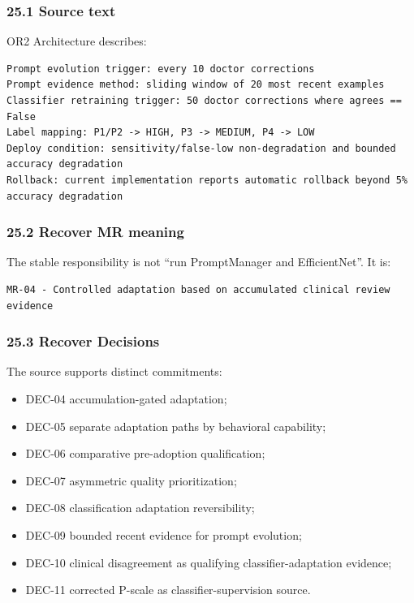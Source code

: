 \documentclass[11pt,a4paper]{article}
\providecommand{\tightlist}{\setlength{\itemsep}{0pt}\setlength{\parskip}{0pt}}
\begin{document}
\subsubsection{25.1 Source text}\label{251-source-text}

OR2 Architecture describes:

\begin{verbatim}
Prompt evolution trigger: every 10 doctor corrections
Prompt evidence method: sliding window of 20 most recent examples
Classifier retraining trigger: 50 doctor corrections where agrees == False
Label mapping: P1/P2 -> HIGH, P3 -> MEDIUM, P4 -> LOW
Deploy condition: sensitivity/false-low non-degradation and bounded accuracy degradation
Rollback: current implementation reports automatic rollback beyond 5% accuracy degradation
\end{verbatim}

\subsubsection{25.2 Recover MR meaning}\label{252-recover-mr-meaning}

The stable responsibility is not ``run PromptManager and EfficientNet''.
It is:

\begin{verbatim}
MR-04 - Controlled adaptation based on accumulated clinical review evidence
\end{verbatim}

\subsubsection{25.3 Recover Decisions}\label{253-recover-decisions}

The source supports distinct commitments:

\begin{itemize}
\tightlist
\item
  DEC-04 accumulation-gated adaptation;
\item
  DEC-05 separate adaptation paths by behavioral capability;
\item
  DEC-06 comparative pre-adoption qualification;
\item
  DEC-07 asymmetric quality prioritization;
\item
  DEC-08 classification adaptation reversibility;
\item
  DEC-09 bounded recent evidence for prompt evolution;
\item
  DEC-10 clinical disagreement as qualifying classifier-adaptation
  evidence;
\item
  DEC-11 corrected P-scale as classifier-supervision source.
\end{itemize}
\end{document}

